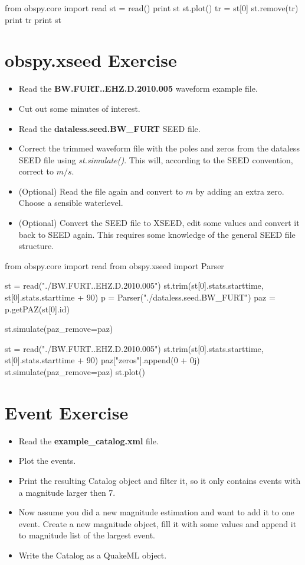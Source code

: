 \documentclass[10pt]{article}
\begin{document}
\begin{python}
from obspy.core import read
st = read()
print st
st.plot()
tr = st[0]
st.remove(tr)
print tr
print st
\end{python}


\section*{obspy.xseed Exercise}
    \begin{itemize}
        \item Read the \textbf{BW.FURT..EHZ.D.2010.005} waveform example file.
        \item Cut out some minutes of interest.
        \item Read the \textbf{dataless.seed.BW\_FURT} SEED file.
        \item Correct the trimmed waveform file with the poles and zeros from
            the dataless SEED file using \textit{st.simulate()}. This will,
            according to the SEED convention, correct to $m/s$.
        \item (Optional) Read the file again and convert to $m$ by adding an
            extra zero. Choose a sensible waterlevel.
        \item (Optional) Convert the SEED file to XSEED, edit some values and
            convert it back to SEED again. This requires some knowledge of the
            general SEED file structure.
    \end{itemize}


\begin{python}
from obspy.core import read
from obspy.xseed import Parser

st = read("./BW.FURT..EHZ.D.2010.005")
st.trim(st[0].stats.starttime, st[0].stats.starttime + 90)
p = Parser("./dataless.seed.BW_FURT")
paz = p.getPAZ(st[0].id)

st.simulate(paz_remove=paz)

st = read("./BW.FURT..EHZ.D.2010.005")
st.trim(st[0].stats.starttime, st[0].stats.starttime + 90)
paz["zeros"].append(0 + 0j)
st.simulate(paz_remove=paz)
st.plot()
\end{python}


\newpage

\section*{Event Exercise}

    \begin{itemize}
        \item Read the \textbf{example\_catalog.xml} file.
        \item Plot the events.
        \item Print the resulting Catalog object and filter it, so it only contains events with a magnitude larger then 7.
        \item Now assume you did a new magnitude estimation and want to add it
            to one event. Create a new magnitude object, fill it with some
            values and append it to magnitude list of the largest event.
        \item Write the Catalog as a QuakeML object.
    \end{itemize}
\end{document}
